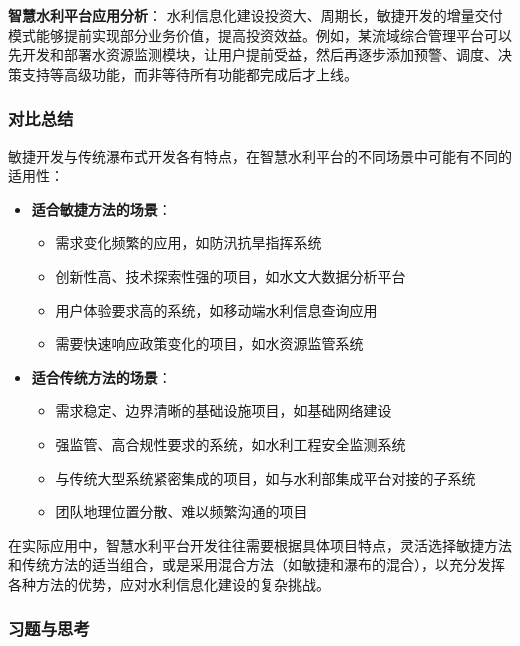 \textbf{智慧水利平台应用分析}：
水利信息化建设投资大、周期长，敏捷开发的增量交付模式能够提前实现部分业务价值，提高投资效益。例如，某流域综合管理平台可以先开发和部署水资源监测模块，让用户提前受益，然后再逐步添加预警、调度、决策支持等高级功能，而非等待所有功能都完成后才上线。

\subsubsection{对比总结}\label{ux5bf9ux6bd4ux603bux7ed3}

敏捷开发与传统瀑布式开发各有特点，在智慧水利平台的不同场景中可能有不同的适用性：

\begin{itemize}
\tightlist
\item
  \textbf{适合敏捷方法的场景}：

  \begin{itemize}
  \tightlist
  \item
    需求变化频繁的应用，如防汛抗旱指挥系统
  \item
    创新性高、技术探索性强的项目，如水文大数据分析平台
  \item
    用户体验要求高的系统，如移动端水利信息查询应用
  \item
    需要快速响应政策变化的项目，如水资源监管系统
  \end{itemize}
\item
  \textbf{适合传统方法的场景}：

  \begin{itemize}
  \tightlist
  \item
    需求稳定、边界清晰的基础设施项目，如基础网络建设
  \item
    强监管、高合规性要求的系统，如水利工程安全监测系统
  \item
    与传统大型系统紧密集成的项目，如与水利部集成平台对接的子系统
  \item
    团队地理位置分散、难以频繁沟通的项目
  \end{itemize}
\end{itemize}

在实际应用中，智慧水利平台开发往往需要根据具体项目特点，灵活选择敏捷方法和传统方法的适当组合，或是采用混合方法（如敏捷和瀑布的混合），以充分发挥各种方法的优势，应对水利信息化建设的复杂挑战。

\subsubsection{习题与思考}\label{ux4e60ux9898ux4e0eux601dux8003}

